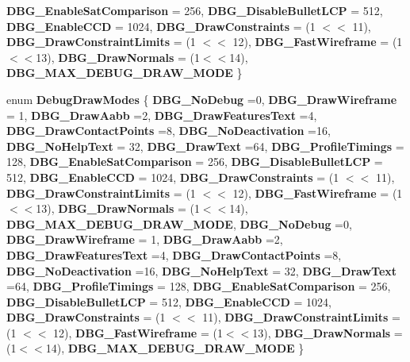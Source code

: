 \begin{DoxyCompactItemize}
{\bfseries D\+B\+G\+\_\+\+Enable\+Sat\+Comparison} = 256, 
{\bfseries D\+B\+G\+\_\+\+Disable\+Bullet\+L\+CP} = 512, 
\newline
{\bfseries D\+B\+G\+\_\+\+Enable\+C\+CD} = 1024, 
{\bfseries D\+B\+G\+\_\+\+Draw\+Constraints} = (1 $<$$<$ 11), 
{\bfseries D\+B\+G\+\_\+\+Draw\+Constraint\+Limits} = (1 $<$$<$ 12), 
{\bfseries D\+B\+G\+\_\+\+Fast\+Wireframe} = (1$<$$<$13), 
\newline
{\bfseries D\+B\+G\+\_\+\+Draw\+Normals} = (1$<$$<$14), 
{\bfseries D\+B\+G\+\_\+\+M\+A\+X\+\_\+\+D\+E\+B\+U\+G\+\_\+\+D\+R\+A\+W\+\_\+\+M\+O\+DE}
 \}
\item 
\mbox{\label{classbtIDebugDraw_ab4bb43fbfefb526c552c0943fac5832a}} 
enum {\bfseries Debug\+Draw\+Modes} \{ \newline
{\bfseries D\+B\+G\+\_\+\+No\+Debug} =0, 
{\bfseries D\+B\+G\+\_\+\+Draw\+Wireframe} = 1, 
{\bfseries D\+B\+G\+\_\+\+Draw\+Aabb} =2, 
{\bfseries D\+B\+G\+\_\+\+Draw\+Features\+Text} =4, 
\newline
{\bfseries D\+B\+G\+\_\+\+Draw\+Contact\+Points} =8, 
{\bfseries D\+B\+G\+\_\+\+No\+Deactivation} =16, 
{\bfseries D\+B\+G\+\_\+\+No\+Help\+Text} = 32, 
{\bfseries D\+B\+G\+\_\+\+Draw\+Text} =64, 
\newline
{\bfseries D\+B\+G\+\_\+\+Profile\+Timings} = 128, 
{\bfseries D\+B\+G\+\_\+\+Enable\+Sat\+Comparison} = 256, 
{\bfseries D\+B\+G\+\_\+\+Disable\+Bullet\+L\+CP} = 512, 
{\bfseries D\+B\+G\+\_\+\+Enable\+C\+CD} = 1024, 
\newline
{\bfseries D\+B\+G\+\_\+\+Draw\+Constraints} = (1 $<$$<$ 11), 
{\bfseries D\+B\+G\+\_\+\+Draw\+Constraint\+Limits} = (1 $<$$<$ 12), 
{\bfseries D\+B\+G\+\_\+\+Fast\+Wireframe} = (1$<$$<$13), 
{\bfseries D\+B\+G\+\_\+\+Draw\+Normals} = (1$<$$<$14), 
\newline
{\bfseries D\+B\+G\+\_\+\+M\+A\+X\+\_\+\+D\+E\+B\+U\+G\+\_\+\+D\+R\+A\+W\+\_\+\+M\+O\+DE}, 
{\bfseries D\+B\+G\+\_\+\+No\+Debug} =0, 
{\bfseries D\+B\+G\+\_\+\+Draw\+Wireframe} = 1, 
{\bfseries D\+B\+G\+\_\+\+Draw\+Aabb} =2, 
\newline
{\bfseries D\+B\+G\+\_\+\+Draw\+Features\+Text} =4, 
{\bfseries D\+B\+G\+\_\+\+Draw\+Contact\+Points} =8, 
{\bfseries D\+B\+G\+\_\+\+No\+Deactivation} =16, 
{\bfseries D\+B\+G\+\_\+\+No\+Help\+Text} = 32, 
\newline
{\bfseries D\+B\+G\+\_\+\+Draw\+Text} =64, 
{\bfseries D\+B\+G\+\_\+\+Profile\+Timings} = 128, 
{\bfseries D\+B\+G\+\_\+\+Enable\+Sat\+Comparison} = 256, 
{\bfseries D\+B\+G\+\_\+\+Disable\+Bullet\+L\+CP} = 512, 
\newline
{\bfseries D\+B\+G\+\_\+\+Enable\+C\+CD} = 1024, 
{\bfseries D\+B\+G\+\_\+\+Draw\+Constraints} = (1 $<$$<$ 11), 
{\bfseries D\+B\+G\+\_\+\+Draw\+Constraint\+Limits} = (1 $<$$<$ 12), 
{\bfseries D\+B\+G\+\_\+\+Fast\+Wireframe} = (1$<$$<$13), 
\newline
{\bfseries D\+B\+G\+\_\+\+Draw\+Normals} = (1$<$$<$14), 
{\bfseries D\+B\+G\+\_\+\+M\+A\+X\+\_\+\+D\+E\+B\+U\+G\+\_\+\+D\+R\+A\+W\+\_\+\+M\+O\+DE}
 \}
\end{DoxyCompactItemize}
